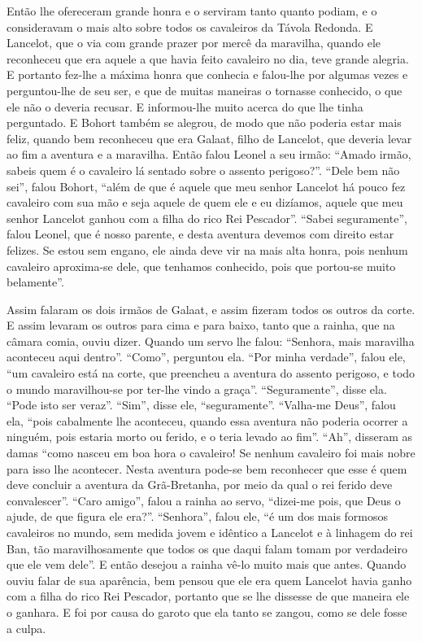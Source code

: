 Então lhe ofereceram grande honra e o serviram tanto quanto podiam, e o
consideravam o mais alto sobre todos os cavaleiros da Távola Redonda. E
Lancelot, que o via com grande prazer por mercê da maravilha, quando ele
reconheceu que era aquele a que havia feito cavaleiro no dia, teve grande
alegria. E portanto fez-lhe  a máxima honra que conhecia e falou-lhe por
algumas vezes e perguntou-lhe de seu ser, e que de muitas maneiras o tornasse
conhecido, o que ele não o deveria recusar. E informou-lhe muito acerca do que
lhe tinha perguntado. E Bohort também se alegrou, de modo que não poderia estar
mais feliz, quando bem reconheceu que era Galaat, filho de Lancelot, que
deveria levar ao fim a aventura e a maravilha. Então falou Leonel a seu irmão:
“Amado irmão, sabeis quem é o cavaleiro lá sentado sobre o assento perigoso?”.
“Dele bem não sei”, falou Bohort, “além de que é aquele que meu senhor
Lancelot há pouco fez cavaleiro com sua mão e seja aquele de quem ele e eu
dizíamos, aquele que meu senhor Lancelot ganhou com a filha do rico Rei
Pescador”. “Sabei seguramente”, falou Leonel, que é nosso parente, e desta
aventura devemos com direito estar felizes.  Se estou sem engano, ele ainda
deve vir na mais alta honra, pois nenhum cavaleiro aproxima-se dele, que
tenhamos conhecido, pois que portou-se muito belamente”. 

Assim falaram os dois irmãos de Galaat, e assim fizeram todos os outros da
corte. E assim levaram os outros para cima e para baixo, tanto que a rainha,
que na câmara comia, ouviu dizer. Quando um servo lhe falou: “Senhora, mais
maravilha aconteceu aqui dentro”. “Como”, perguntou ela. “Por minha verdade”,
falou ele, “um cavaleiro está na corte, que preencheu a aventura do assento
perigoso, e todo o mundo maravilhou-se por ter-lhe vindo a graça”.
“Seguramente”, disse ela. “Pode isto ser veraz”. “Sim”, disse ele,
“seguramente”. “Valha-me Deus”, falou ela, “pois cabalmente lhe aconteceu,
quando essa aventura não poderia ocorrer a ninguém, pois estaria morto ou
ferido, e o teria levado ao fim”. “Ah”, disseram as damas “como nasceu em boa
hora o cavaleiro! Se nenhum cavaleiro foi mais nobre para isso lhe acontecer.
Nesta aventura pode-se bem reconhecer que esse é quem deve concluir a aventura
da Grã-Bretanha, por meio da qual o rei ferido deve convalescer”. “Caro
amigo”, falou a rainha ao servo, “dizei-me pois, que Deus o ajude, de que
figura ele era?”. “Senhora”, falou ele, “é um dos mais formosos cavaleiros no
mundo, sem medida jovem e idêntico a Lancelot e à linhagem do rei Ban, tão
maravilhosamente que todos os que daqui falam tomam por verdadeiro que ele vem
dele”. E então desejou a rainha vê-lo muito mais que antes. Quando ouviu falar
de sua aparência, bem pensou que ele era quem Lancelot havia ganho com a filha
do rico Rei Pescador, portanto que se lhe dissesse de que maneira ele o
ganhara. E foi por causa do garoto que ela tanto se zangou, como se dele fosse
a culpa. 

